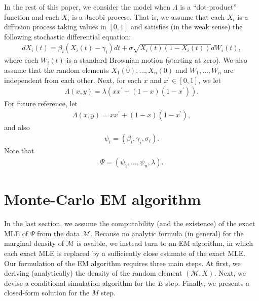 \documentclass[12pt]{article}%
\begin{document}
In the rest of this paper, we consider the model when $\Lambda$ is a ``dot-product'' function
and each $X_i$ is a Jacobi process.  That is, we assume that each $X_i$ is a diffusion 
process taking values in $[0,1]$ and satisfies (in the weak sense)
the following stochastic differential equation:
\begin{eqnarray}
dX_i(t) = \beta_i(X_i(t) - \gamma_i) dt + \sigma \sqrt{X_i(t) (1-X_i(t))} dW_i(t), 
\end{eqnarray}
where each $W_i(t)$ is a standard Brownian motion (starting at zero).  We also assume that the random elements $X_1(0),\ldots, X_n(0)$ and $W_1,\ldots, W_n$ are independent from each other.  Next, for each $x$ and $x^\prime \in [0,1]$, we let 
\begin{eqnarray}
\Lambda(x,y) = \lambda (x x^\prime + (1-x) (1-x^\prime)).
\end{eqnarray}
For future reference, let
\begin{eqnarray}
\overline{\Lambda}(x,y) = x x^\prime + (1-x) (1-x^\prime),
\end{eqnarray}
and also
\begin{eqnarray}
\psi_i = (\beta_i,\gamma_i,\sigma_i). 
\end{eqnarray}
Note that 
\begin{eqnarray}
\Psi = (\psi_1,\ldots, \psi_n,\lambda).
\end{eqnarray}

\section{Monte-Carlo EM algorithm}
In the last section, we assume the computability (and the existence) 
of the exact MLE of $\Psi$ from the data $\mathcal M$.   
Because no analytic formula (in general) for the marginal density 
of $\mathcal M$ is avaible,
we instead turn to an EM algorithm, in which each exact MLE is replaced 
by a sufficiently close estimate of the exact MLE.
Our formulation of the EM algorithm requires 
three main steps.  
At first, we deriving (analytically) 
the density of the random element $(\mathcal M, X)$.  
Next, we devise a conditional simulation algorithm for the $E$ step.  
Finally, we presents a closed-form solution for the $M$ step.
\end{document}
